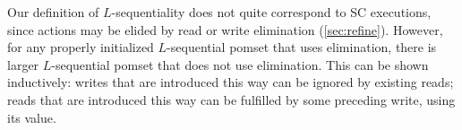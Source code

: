 
Our definition of $L$-sequentiality does not quite correspond to SC
executions, since actions may be elided by read or write elimination
(\textsection\ref{sec:refine}).  However, for any properly initialized
$L$-sequential pomset that uses elimination, there is larger $L$-sequential
pomset that does not use elimination. This can be shown inductively: writes
that are introduced this way can be ignored by existing reads; reads that are
introduced this way can be fulfilled by some preceding write, using its
value.

\endinput

\subsection{Proof chat}
  \textcolor{red}{WIP...}

  
  For such programs, we define up with a procedure that inductively generates
  all the pomsets in $\semmin{\aCmd}$.  It works very much like an opsem, but
  on $\rppo$-order, rather than full program order.

  In a minimal pomset, cross-thread order is only introduced by the
  requirement of fulfillment.

  Here's the procedure.  We are building pomset $\aPS$, with set $\aPSS'$ of
  possible extensions.  
  
